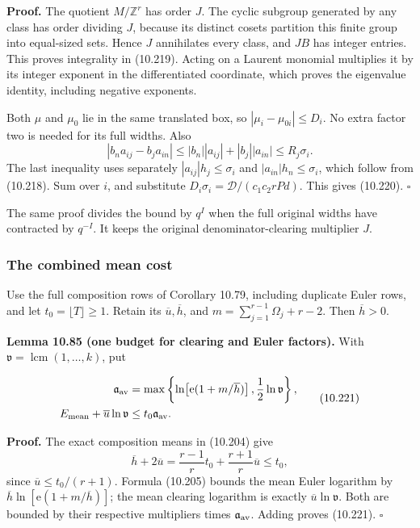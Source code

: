 \documentclass[
  11pt,
  a4paper,
]{article}
\begin{document}
\textbf{Proof.} The quotient \(M/\mathbb Z^r\) has order \(J\). The
cyclic subgroup generated by any class has order dividing \(J\), because
its distinct cosets partition this finite group into equal-sized sets.
Hence \(J\) annihilates every class, and \(JB\) has integer entries.
This proves integrality in (10.219). Acting on a Laurent monomial
multiplies it by its integer exponent in the differentiated coordinate,
which proves the eigenvalue identity, including negative exponents.

Both \(\mu\) and \(\mu_0\) lie in the same translated box, so
\(|\mu_i-\mu_{0i}|\le D_i\). No extra factor two is needed for its full
widths. Also \[
|b_na_{ij}-b_ja_{in}|
\le |b_n||a_{ij}|+|b_j||a_{in}|
\le R_j\sigma_i.
\] The last inequality uses separately \(|a_{ij}|h_j\le\sigma_i\) and
\(|a_{in}|h_n\le\sigma_i\), which follow from (10.218). Sum over \(i\),
and substitute \(D_i\sigma_i=\mathcal D/(c_1c_2rPd)\). This gives
(10.220). \(\square\)

The same proof divides the bound by \(q^I\) when the full original
widths have contracted by \(q^{-I}\). It keeps the original
denominator-clearing multiplier \(J\).

\subsubsection{The combined mean cost}\label{the-combined-mean-cost}

Use the full composition rows of Corollary 10.79, including duplicate
Euler rows, and let \(t_0=\lfloor T\rfloor\ge1\). Retain its
\(\overline u,\overline h\), and \(m=\sum_{j=1}^{r-1}\Omega_j+r-2\).
Then \(\overline h>0\).

\textbf{Lemma 10.85 (one budget for clearing and Euler factors).} With
\(\mathfrak v=\operatorname{lcm}(1,\ldots,k)\), put

\[
\begin{aligned}
\mathfrak a_{\rm av}
&=\max\left\{\ln\!\left[\mathrm e(1+m/\overline h)\right],
                   \frac12\ln\mathfrak v\right\},\\
E_{\rm mean}+\overline u\ln\mathfrak v
&\le t_0\mathfrak a_{\rm av}.
\end{aligned}
\tag{10.221}
\]

\textbf{Proof.} The exact composition means in (10.204) give \[
\overline h+2\overline u
=\frac{r-1}{r}t_0+\frac{r+1}{r}\overline u
\le t_0,
\] since \(\overline u\le t_0/(r+1)\). Formula (10.205) bounds the mean
Euler logarithm by \(\overline h\ln[\mathrm e(1+m/\overline h)]\); the
mean clearing logarithm is exactly \(\overline u\ln\mathfrak v\). Both
are bounded by their respective multipliers times
\(\mathfrak a_{\rm av}\). Adding proves (10.221). \(\square\)
\end{document}
